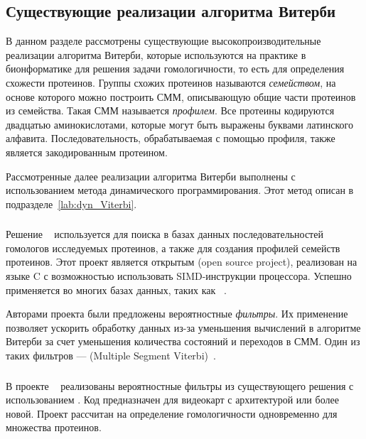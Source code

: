 \subsection{Существующие реализации алгоритма Витерби}
\label{lab:exist_Viterbi}
В данном разделе рассмотрены существующие 
высокопроизводительные реализации алгоритма Витерби, которые 
используются на практике в бионформатике для решения задачи 
гомологичности, то есть для определения схожести протеинов.
Группы схожих протеинов называются \emph{семейством},
на основе которого можно построить СММ, описывающую общие 
части протеинов из семейства.
Такая СММ называется \emph{профилем}.
Все протеины кодируются двадцатью аминокислотами, 
которые могут быть выражены буквами латинского алфавита.
Последовательность, обрабатываемая с помощью профиля, также 
является закодированным протеином.

Рассмотренные далее реализации алгоритма Витерби выполнены с 
использованием метода динамического программирования.
Этот метод описан в подразделе~\ref{lab:dyn_Viterbi}.

\subsubsection{}
\label{lab:HMMer}
Решение ~\cite{HMMer} используется для поиска в базах 
данных последовательностей гомологов исследуемых протеинов, а 
также для создания профилей семейств протеинов.
Этот проект является открытым (open source project), реализован  на языке C с возможностью
использовать SIMD-инструкции процессора.
Успешно применяется во многих базах данных, таких как ~\cite{Pfam}.

Авторами проекта были предложены вероятностные \emph{фильтры}.
Их применение позволяет ускорить обработку данных из-за 
уменьшения вычислений в алгоритме Витерби за счет уменьшения 
количества состояний и переходов в СММ.
Один из таких фильтров ---  (Multiple Segment 
Viterbi)~\cite{MSV_Eddy}.

\subsubsection{}
\label{lab:CUDAMPF}
В проекте ~\cite{cudampf} реализованы
вероятностные фильтры из существующего решения  с использованием 
.
Код предназначен для видеокарт  с 
архитектурой  или более новой.
Проект рассчитан на определение гомологичности одновременно 
для множества протеинов.

